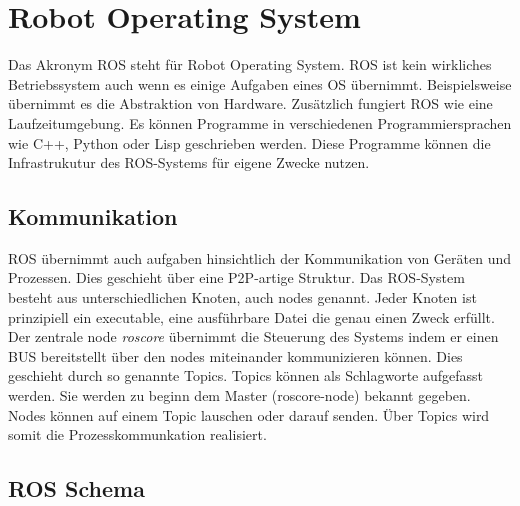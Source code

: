 	\section{Robot Operating System}
	Das Akronym ROS steht für Robot Operating System. ROS ist kein wirkliches Betriebssystem auch wenn es einige Aufgaben eines OS übernimmt. Beispielsweise übernimmt es die Abstraktion von Hardware. Zusätzlich fungiert ROS wie eine Laufzeitumgebung. Es können Programme in verschiedenen Programmiersprachen wie C++, Python oder Lisp geschrieben werden. Diese Programme können die Infrastrukutur des ROS-Systems für eigene Zwecke nutzen.
		\subsection{Kommunikation}
		ROS übernimmt auch aufgaben hinsichtlich der Kommunikation von Geräten und Prozessen. Dies geschieht über eine P2P-artige Struktur. Das ROS-System besteht aus unterschiedlichen Knoten, auch nodes genannt. Jeder Knoten ist prinzipiell ein executable, eine ausführbare Datei die genau einen Zweck erfüllt. Der zentrale node \textit{roscore} übernimmt die Steuerung des Systems indem er einen BUS bereitstellt über den nodes miteinander kommunizieren können. Dies geschieht durch so genannte Topics. Topics können als Schlagworte aufgefasst werden. Sie werden zu beginn dem Master (roscore-node) bekannt gegeben. Nodes können auf einem Topic lauschen oder darauf senden. Über Topics wird somit die Prozesskommunkation realisiert. 
		\subsection{ROS Schema}
		

